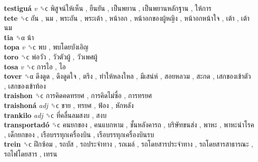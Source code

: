 \textbf{testiguá} \emph{v}  ␝ϲ   พิสูจน์ให้เห็น ,  ยืนยัน ,  เป็นพยาน ,  เป็นพยานหลักฐาน ,  ให้การ   \\
\textbf{tete} ␝ϲ   ถัน ,  นม ,  พระถัน ,  พระเต้า ,  หน้าอก ,  หน้าอกของผู้หญิง ,  หน้าอกหน้าใจ ,  เต้า ,  เต้านม   \\
\textbf{tia} ␝α   น้า   \\
\textbf{topa} \emph{v}  ␝ϲ   พบ ,  พบโดยบังเอิญ   \\
\textbf{toro} ␝ϲ   พ่อวัว ,  วัวตัวผู้ ,  วัวเพศผู้   \\
\textbf{tosa} \emph{v}  ␝ϲ   การไอ ,  ไอ   \\
\textbf{tover} ␝α   ดึงดูด ,  ดึงดูดใจ ,  ตรึง ,  ทำให้หลงใหล ,  มีเสน่ห์ ,  สอยหลวม ,  สะกด ,  เสกของเข้าตัว ,  เสกของเข้าท้อง   \\
\textbf{traishon} ␝ϲ   การคิดคดทรยศ ,  การคิดไม่ซื่อ ,  การทรยศ   \\
\textbf{traishoná} \emph{adj}  ␝ϲ   ขาย ,  ทรยศ ,  ฟ้อง ,  หักหลัง   \\
\textbf{trankilo} \emph{adj}  ␝ϲ   ที่คลื่นลมสงบ ,  สงบ   \\
\textbf{transportadó} ␝ϲ   คนยกของ ,  คนแบกหาม ,  ชั้นหลังคารถ ,  บริษัทขนส่ง ,  พาหะ ,  พาหะนำโรค ,  เด็กยกของ ,  เรือบรรทุกเครื่องบิน ,  เรือบรรทุกเครื่องบินรบ   \\
\textbf{trein} ␝ϲ   ฝึกซ้อม ,  รถบัส ,  รถประจำทาง ,  รถเมล์ ,  รถโดยสารประจำทาง ,  รถโดยสารสาธารณะ ,  รถไฟโดยสาร ,  เทรน   \\
